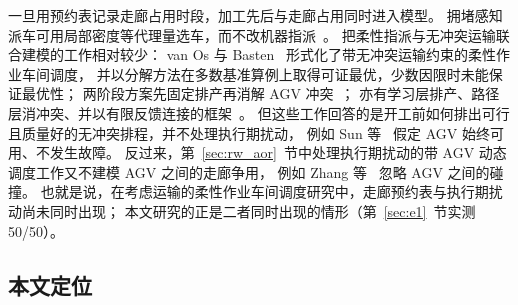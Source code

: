 \documentclass[manuscript,screen,review]{acmart}
\newcommand{\NPairs}{50}
\newcommand{\PassMiss}{\NPairs/\NPairs}      %
\begin{document}
一旦用预约表记录走廊占用时段，加工先后与走廊占用同时进入模型。
拥堵感知派车可用局部密度等代理量选车，而不改机器指派~\cite{kim2026congestion}。
把柔性指派与无冲突运输联合建模的工作相对较少：
van Os 与 Basten~\cite{vanos2026exact} 形式化了带无冲突运输约束的柔性作业车间调度，
并以分解方法在多数基准算例上取得可证最优，少数因限时未能保证最优性；
两阶段方案先固定排产再消解 AGV 冲突~\cite{sun2023integrated}；
亦有学习层排产、路径层消冲突、并以有限反馈连接的框架~\cite{li2026framework}。
但这些工作回答的是开工前如何排出可行且质量好的无冲突排程，并不处理执行期扰动，
例如 Sun 等~\cite{sun2023integrated} 假定 AGV 始终可用、不发生故障。
反过来，第~\ref{sec:rw_aor}~节中处理执行期扰动的带 AGV 动态调度工作又不建模 AGV 之间的走廊争用，
例如 Zhang 等~\cite{zhang2023energy} 忽略 AGV 之间的碰撞。
也就是说，在考虑运输的柔性作业车间调度研究中，走廊预约表与执行期扰动尚未同时出现；
本文研究的正是二者同时出现的情形（第~\ref{sec:e1}~节实测 \PassMiss）。

\subsection{本文定位}
\label{sec:rw_claim}
\end{document}
